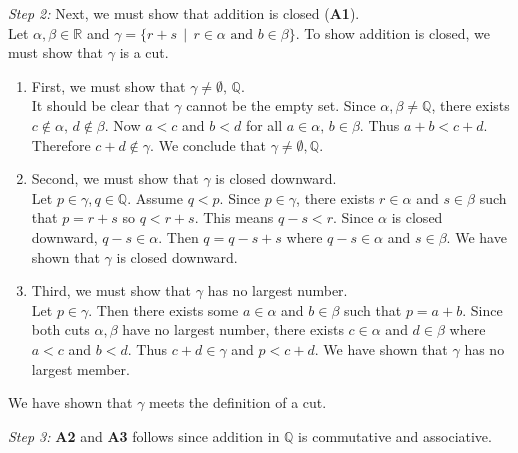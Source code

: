 \documentclass[../main.tex]{subfiles}
\begin{document}
\emph{Step 2:} Next, we must show that addition is closed (\textbf{A1}). \\
Let \( \alpha, \beta \in \mathbb{R} \) and \( \gamma = \{r+s \, \mid \, r \in \alpha \text{ and } b \in \beta \} \).
To show addition is closed, we must show that \( \gamma \) is a cut.
\begin{enumerate}
    \item First, we must show that \( \gamma \neq \emptyset, \, \mathbb{Q} \). \\
    It should be clear that \( \gamma \) cannot be the empty set.
    Since \( \alpha, \beta \neq \mathbb{Q} \), there exists \( c \notin \alpha, \, d \notin \beta \).
    Now \( a < c \) and \( b < d \) for all \( a \in \alpha, \, b \in \beta \). Thus \( a + b < c + d \).
    Therefore \( c + d \notin \gamma \). We conclude that \( \gamma \neq \emptyset, \mathbb{Q} \).

    \item Second, we must show that \( \gamma \) is closed downward. \\
    Let \( p \in \gamma, q \in \mathbb{Q} \). Assume \( q < p \).
    Since \( p \in  \gamma \), there exists \( r \in \alpha \) and \( s \in \beta \) such that \( p = r+s \) so \( q < r+s \).
    This means \( q-s < r \). Since \( \alpha \) is closed downward, \( q-s \in \alpha \).
    Then \( q = q-s +s \) where \( q-s \in \alpha \) and \( s \in \beta \). We have shown that \( \gamma \) is closed downward.

    \item Third, we must show that \( \gamma \) has no largest number. \\
    Let \( p \in \gamma \). Then there exists some \( a \in \alpha \) and \( b \in \beta \) such that \( p = a + b \).
    Since both cuts \( \alpha, \beta \) have no largest number, there exists \( c \in \alpha \) and \( d \in \beta \) where \( a < c \) and \( b < d \).
    Thus \( c + d \in \gamma \) and \( p < c + d \). We have shown that \( \gamma \) has no largest member.
\end{enumerate}
We have shown that \( \gamma \) meets the definition of a cut.

\emph{Step 3:} \textbf{A2} and \textbf{A3} follows since addition in \( \mathbb{Q} \) is commutative and associative.
    
\end{document}
